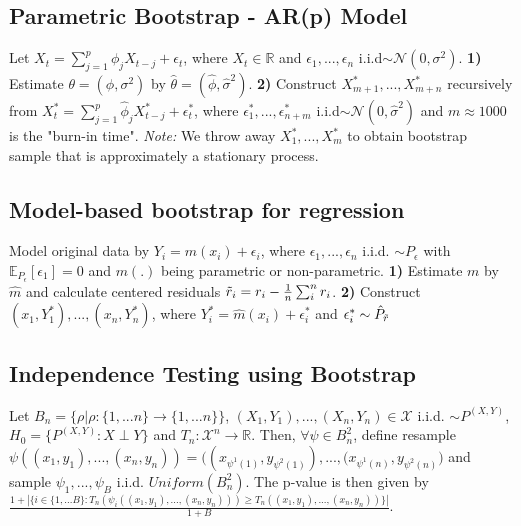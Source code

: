 \subsection*{Parametric Bootstrap - AR(p) Model}
Let $X_t = \sum_{j = 1}^{p}\phi_j X_{t-j} + \epsilon_t$, where $X_t \in \mathbb{R}$ and $\epsilon_1,..., \epsilon_n$ i.i.d$\sim \mathcal{N}(0, \sigma^2)$. \textbf{1)} Estimate $\theta = (\phi, \sigma^2)$ by $\hat{\theta} = (\hat{\phi}, \hat{\sigma}^2)$. \textbf{2)} Construct $X_{m+1}^*,...,X_{m+n}^*$ recursively from $X_t^* = \sum_{j = 1}^{p}\hat{\phi}_j X_{t-j}^* + \epsilon_t^*$, where $\epsilon_1^*,..., \epsilon_{n+m}^*$ i.i.d$\sim \mathcal{N}(0, \hat{\sigma}^2)$ and $m \approx 1000$ is the "burn-in time". \emph{Note:} We throw away $X_1^*,...,X_m^*$ to obtain bootstrap sample that is approximately a stationary process. 

\subsection*{Model-based bootstrap for regression}
Model original data by $Y_i = m(x_i) + \epsilon_i$, where $\epsilon_1,..., \epsilon_n$ i.i.d. $\sim P_{\epsilon}$ with $\mathbb{E}_{P_{\epsilon}}[\epsilon_1] = 0$ and $m(.)$ being parametric or non-parametric. \textbf{1)} Estimate $m$ by $\hat{m}$ and calculate centered residuals $\Tilde{r}_i = r_i - \frac{1}{n}\sum_{i}^{n} r_i$. \textbf{2)} Construct $(x_1, Y_1^*),...,(x_n, Y_n^*)$, where $Y_i^* = \hat{m}(x_i) + \epsilon_i^*$ and $\epsilon_i^* \sim \hat{P}_{\Tilde{r}}$

\subsection*{Independence Testing using Bootstrap}
Let $B_n = \{\rho | \rho: \{1,...n\} \rightarrow \{1,...n\}\}$, $(X_1, Y_1),...,(X_n,Y_n) \in \mathcal{X}$ i.i.d. $\sim P^{(X,Y)}$, $H_0 = \{P^{(X,Y)}: X \perp Y\}$ and $T_n: \mathcal{X}^n \rightarrow \mathbb{R}$. Then, $\forall \psi \in B_{n}^2$, define resample $\psi((x_1, y_1),...,(x_n,y_n)) = \big((x_{\psi^1(1)},y_{\psi^2(1)}),...,(x_{\psi^1(n)},y_{\psi^2(n)}\big)$ and sample $\psi_1,...,\psi_B$ i.i.d. $Uniform(B_{n}^2)$. The p-value is then given by $\frac{1 + |\{i \in \{1,...B\} : T_n(\psi_i((x_1, y_1),...,(x_n,y_n))) \geq T_n((x_1, y_1),...,(x_n,y_n))\}|}{1 + B}$.